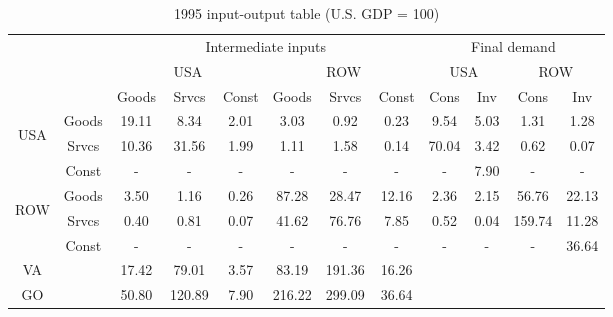 \begin{table}[p]
\footnotesize
\begin{center}
\caption{1995 input-output table (U.S. GDP = 100)}
\label{tab:iomat_2c}
\begin{tabular}{cccccccccccc}
\toprule
& & \multicolumn{6}{c}{Intermediate inputs}&\multicolumn{4}{c}{Final demand}\\
\cmidrule(rl){3-8}\cmidrule(rl){9-12}&& \multicolumn{3}{c}{USA}& \multicolumn{3}{c}{ROW}& \multicolumn{2}{c}{USA}& \multicolumn{2}{c}{ROW}\\
\cmidrule(rl){3-5}\cmidrule(rl){6-8}\cmidrule(rl){9-10}\cmidrule(rl){11-12}
&&Goods&Srvcs&Const&Goods&Srvcs&Const& Cons & Inv& Cons & Inv\\
\midrule
\multirow{3}{*}{\begin{sideways}USA\end{sideways}}&Goods&19.11&8.34&2.01&3.03&0.92&0.23&9.54&5.03&1.31&1.28\\
&Srvcs&10.36&31.56&1.99&1.11&1.58&0.14&70.04&3.42&0.62&0.07\\
&Const&-&-&-&-&-&-&-&7.90&-&-\\
\multirow{3}{*}{\begin{sideways}ROW\end{sideways}}&Goods&3.50&1.16&0.26&87.28&28.47&12.16&2.36&2.15&56.76&22.13\\
&Srvcs&0.40&0.81&0.07&41.62&76.76&7.85&0.52&0.04&159.74&11.28\\
&Const&-&-&-&-&-&-&-&-&-&36.64\\
\midrule
VA &&17.42&79.01&3.57&83.19&191.36&16.26\\
\midrule
GO &&50.80&120.89&7.90&216.22&299.09&36.64\\
\bottomrule
\end{tabular}
\end{center}
\normalsize
\end{table}
